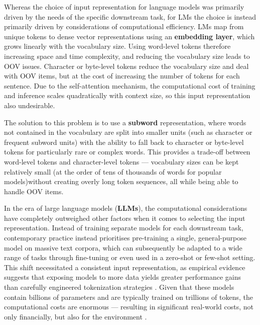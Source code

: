 Whereas the choice of input representation for \ngram language models was primarily driven by the needs of the specific downstream task, for LMs the choice is instead primarily driven by considerations of computational efficiency. LMs map from unique tokens to dense vector representations using an \textbf{embedding layer}, which grows linearly with the vocabulary size. Using word-level tokens therefore increasing space and time complexity, and reducing the vocabulary size leads to OOV issues. Character or byte-level tokens reduce the vocabulary size and deal with OOV items, but at the cost of increasing the number of tokens for each sentence. Due to the self-attention mechanism, the computational cost of training and inference scales quadratically with context size, so this input representation also undesirable.

The solution to this problem is to use a \textbf{subword} representation, where words not contained in the vocabulary are split into smaller units (such as character \ngrams or frequent subword units) with the ability to fall back to character or byte-level tokens for particularly rare or complex words. This provides a trade-off between word-level tokens and character-level tokens --- vocabulary sizes can be kept relatively small (at the order of tens of thousands of words for popular models)without creating overly long token sequences, all while being able to handle OOV items.

In the era of large language models (\textbf{LLMs}), the computational considerations have completely outweighed other factors when it comes to selecting the input representation. Instead of training separate models for each downstream task, contemporary practice instead prioritises pre-training a single, general-purpose model on massive text corpora, which can subsequently be adapted to a wide range of tasks through fine-tuning or even used in a zero-shot or few-shot setting. This shift necessitated a consistent input representation, as empirical evidence suggests that exposing models to more data yields greater performance gains than carefully engineered tokenization strategies \citep{brown-2020-gpt3}. Given that these models contain billions of parameters and are typically trained on trillions of tokens, the computational costs are enormous --- resulting in significant real-world costs, not only financially, but also for the environment \citep{strubell-etal-2019-energy, patterson2021carbonemissionslargeneural, bender2021parrots,luccioni2022estimatingcarbonfootprintbloom}.

